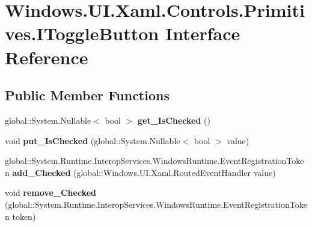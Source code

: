 \hypertarget{interface_windows_1_1_u_i_1_1_xaml_1_1_controls_1_1_primitives_1_1_i_toggle_button}{}\section{Windows.\+U\+I.\+Xaml.\+Controls.\+Primitives.\+I\+Toggle\+Button Interface Reference}
\label{interface_windows_1_1_u_i_1_1_xaml_1_1_controls_1_1_primitives_1_1_i_toggle_button}
\subsection*{Public Member Functions}
\begin{DoxyCompactItemize}
\item 
\mbox{\label{interface_windows_1_1_u_i_1_1_xaml_1_1_controls_1_1_primitives_1_1_i_toggle_button_ab2f2c05633de2713aaa610f12657e543}} 
global\+::\+System.\+Nullable$<$ bool $>$ {\bfseries get\+\_\+\+Is\+Checked} ()
\item 
\mbox{\label{interface_windows_1_1_u_i_1_1_xaml_1_1_controls_1_1_primitives_1_1_i_toggle_button_afaace15befe9dea02eb0d81c76b8ff32}} 
void {\bfseries put\+\_\+\+Is\+Checked} (global\+::\+System.\+Nullable$<$ bool $>$ value)
\item 
\mbox{\label{interface_windows_1_1_u_i_1_1_xaml_1_1_controls_1_1_primitives_1_1_i_toggle_button_a9579b9435c7ea6041a3d25d96e4e02b6}} 
global\+::\+System.\+Runtime.\+Interop\+Services.\+Windows\+Runtime.\+Event\+Registration\+Token {\bfseries add\+\_\+\+Checked} (global\+::\+Windows.\+U\+I.\+Xaml.\+Routed\+Event\+Handler value)
\item 
\mbox{\label{interface_windows_1_1_u_i_1_1_xaml_1_1_controls_1_1_primitives_1_1_i_toggle_button_afa5ff3c678236b48b302c60a17489ad3}} 
void {\bfseries remove\+\_\+\+Checked} (global\+::\+System.\+Runtime.\+Interop\+Services.\+Windows\+Runtime.\+Event\+Registration\+Token token)

\end{DoxyCompactItemize}
